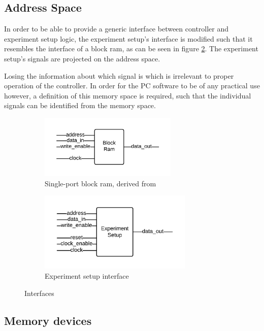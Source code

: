 \documentclass[openright]{uva-bachelor-thesis}
\begin{document}
\subsection{Address Space}
In order to be able to provide a generic interface between controller and experiment setup logic, the experiment setup's interface is modified such that it resembles the interface of a block ram, as can be seen in figure \ref{fig:interface-experiment}. The experiment setup's signals are projected on the address space. 

Losing the information about which signal is which is irrelevant to proper operation of the controller. In order for the PC software to be of any practical use however, a definition of this memory space is required, such that the individual signals can be identified from the memory space. 

\begin{figure}[h]
    \centering
    \begin{subfigure}[t]{0.5\textwidth}
        \centering
        \includegraphics[height=1.2in]{interface-bram}
        \caption{Single-port block ram, derived from \cite{RAMs68}}
        \label{fig:interface-bram}
    \end{subfigure}%
    \begin{subfigure}[t]{0.5\textwidth}
        \centering
        \includegraphics[height=1.5in]{interface-experiment}
        \caption{Experiment setup interface}
        \label{fig:interface-experiment}
    \end{subfigure}
    \caption{Interfaces}
    \label{fig:interfaces}
\end{figure}


\subsection{Memory devices}
\end{document}
